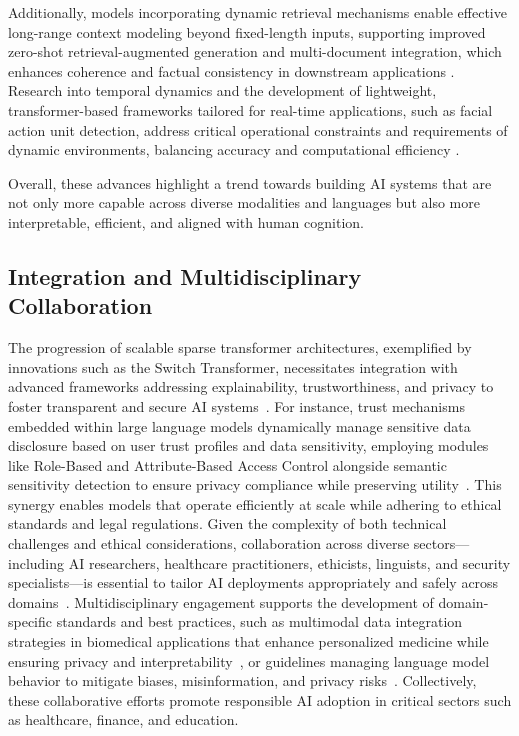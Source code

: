 \documentclass[sigconf]{acmart}
\begin{document}
Additionally, models incorporating dynamic retrieval mechanisms enable effective long-range context modeling beyond fixed-length inputs, supporting improved zero-shot retrieval-augmented generation and multi-document integration, which enhances coherence and factual consistency in downstream applications \cite{ref29}. Research into temporal dynamics and the development of lightweight, transformer-based frameworks tailored for real-time applications, such as facial action unit detection, address critical operational constraints and requirements of dynamic environments, balancing accuracy and computational efficiency \cite{ref18}. 

Overall, these advances highlight a trend towards building AI systems that are not only more capable across diverse modalities and languages but also more interpretable, efficient, and aligned with human cognition.

\subsection{Integration and Multidisciplinary Collaboration}

The progression of scalable sparse transformer architectures, exemplified by innovations such as the Switch Transformer, necessitates integration with advanced frameworks addressing explainability, trustworthiness, and privacy to foster transparent and secure AI systems~\cite{ref14}. For instance, trust mechanisms embedded within large language models dynamically manage sensitive data disclosure based on user trust profiles and data sensitivity, employing modules like Role-Based and Attribute-Based Access Control alongside semantic sensitivity detection to ensure privacy compliance while preserving utility~\cite{ref11}. This synergy enables models that operate efficiently at scale while adhering to ethical standards and legal regulations. Given the complexity of both technical challenges and ethical considerations, collaboration across diverse sectors—including AI researchers, healthcare practitioners, ethicists, linguists, and security specialists—is essential to tailor AI deployments appropriately and safely across domains~\cite{ref11,ref12,ref14,ref34}. Multidisciplinary engagement supports the development of domain-specific standards and best practices, such as multimodal data integration strategies in biomedical applications that enhance personalized medicine while ensuring privacy and interpretability~\cite{ref12}, or guidelines managing language model behavior to mitigate biases, misinformation, and privacy risks~\cite{ref34}. Collectively, these collaborative efforts promote responsible AI adoption in critical sectors such as healthcare, finance, and education.
\end{document}
